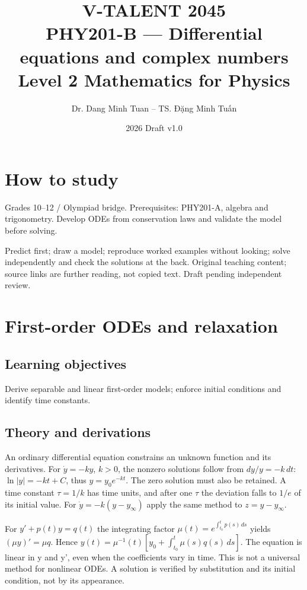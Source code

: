 \documentclass[11pt,a4paper,openany]{book}
\begin{document}
\title{V-TALENT 2045\\ PHY201-B --- Differential equations and complex numbers\\\large Level 2 \textbar{} Mathematics for Physics}
\author{Dr. Dang Minh Tuan -- TS. Đặng Minh Tuấn}
\date{2026 \textbar{} Draft v1.0}
\maketitle
\tableofcontents
\chapter*{How to study}
Grades 10–12 / Olympiad bridge. Prerequisites: PHY201-A, algebra and trigonometry. Develop ODEs from conservation laws and validate the model before solving.

Predict first; draw a model; reproduce worked examples without looking; solve independently and check the solutions at the back. Original teaching content; source links are further reading, not copied text. Draft pending independent review.
\chapter{First-order ODEs and relaxation}
\section{Learning objectives}
Derive separable and linear first-order models; enforce initial conditions and identify time constants.
\section{Theory and derivations}
An ordinary differential equation constrains an unknown function and its derivatives. For $\dot y=-ky$, $k>0$, the nonzero solutions follow from $dy/y=-k\,dt$: $\ln|y|=-kt+C$, thus $y=y_0e^{-kt}$. The zero solution must also be retained. A time constant $\tau=1/k$ has time units, and after one $\tau$ the deviation falls to $1/e$ of its initial value. For $\dot y=-k(y-y_\infty)$ apply the same method to $z=y-y_\infty$.

For $y'+p(t)y=q(t)$ the integrating factor $\mu(t)=e^{\int_{t_0}^{t}p(s)\,ds}$ yields $(\mu y)'=\mu q$. Hence $y(t)=\mu^{-1}(t)[y_0+\int_{t_0}^t\mu(s)q(s)\,ds]$. The equation is linear in y and y', even when the coefficients vary in time. This is not a universal method for nonlinear ODEs. A solution is verified by substitution and its initial condition, not by its appearance.
\end{document}
